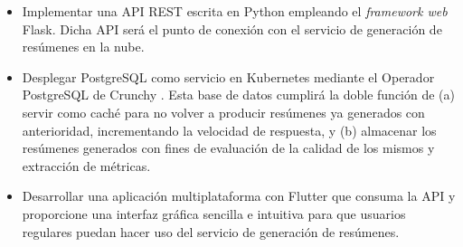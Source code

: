 \begin{itemize}
	\item [\textbullet] Implementar una API REST escrita en Python empleando el \emph{framework web} Flask. Dicha API será el punto de conexión con el servicio de generación de resúmenes en la nube.
	
	\item [\textbullet] Desplegar PostgreSQL como servicio en Kubernetes mediante el Operador PostgreSQL de Crunchy \cite{crunchy21}. Esta base de datos cumplirá la doble función de (a) servir como caché para no volver a producir resúmenes ya generados con anterioridad, incrementando la velocidad de respuesta, y (b) almacenar los resúmenes generados con fines de evaluación de la calidad de los mismos y extracción de métricas.
	
	\item [\textbullet] Desarrollar una aplicación multiplataforma con Flutter que consuma la API y proporcione una interfaz gráfica sencilla e intuitiva para que usuarios regulares puedan hacer uso del servicio de generación de resúmenes.
\end{itemize}